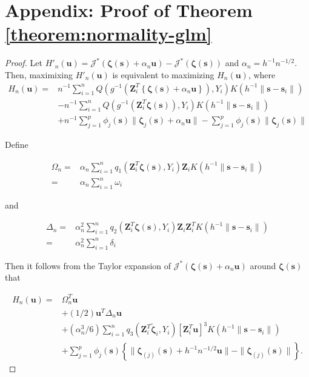 \documentclass[authoryear,review, 12pt]{elsarticle}
\begin{document}
\section*{Appendix: Proof of Theorem \ref{theorem:normality-glm}}
\begin{proof}
Let $H'_{n}(\bm{u})=\mathcal{J}^{*}\left(\bm{\zeta}\left(\bm{s}\right)+\alpha_{n}\bm{u}\right)-\mathcal{J}^{*}\left(\bm{\zeta}\left(\bm{s}\right)\right)$
and $\alpha_{n}=h^{-1}n^{-1/2}$. Then, maximixing $H'_{n}\left(\bm{u}\right)$
is equivalent to maximizing $H_{n}\left(\bm{u}\right)$, where 
\begin{align*}
H_{n}(\bm{u})= & n^{-1}\sum_{i=1}^{n}Q\left(g^{-1}\left(\bm{Z}_{i}^{T}\left\{ \bm{\zeta}\left(\bm{s}\right)+\alpha_{n}\bm{u}\right\} \right),Y_{i}\right)K\left(h^{-1}\|\bm{s}-\bm{s}_{i}\|\right)\\
 & -n^{-1}\sum_{i=1}^{n}Q\left(g^{-1}\left(\bm{Z}_{i}^{T}\bm{\zeta}\left(\bm{s}\right)\right),Y_{i}\right)K\left(h^{-1}\|\bm{s}-\bm{s}_{i}\|\right)\\
 & +n^{-1}\sum_{j=1}^{p}\phi_{j}\left(\bm{s}\right)\|\bm{\zeta}_{j}\left(\bm{s}\right)+\alpha_{n}\bm{u}\|-\sum_{j=1}^{p}\phi_{j}\left(\bm{s}\right)\|\bm{\zeta}_{j}\left(\bm{s}\right)\|
\end{align*}


Define

\begin{align*}
\Omega_{n}= & \alpha_{n}\sum_{i=1}^{n}q_{1}\left(\bm{Z}_{i}^{T}\bm{\zeta}\left(\bm{s}\right),Y_{i}\right)\bm{Z}_{i}K\left(h^{-1}\|\bm{s}-\bm{s}_{i}\|\right)\\
= & \alpha_{n}\sum_{i=1}^{n}\omega_{i}
\end{align*}


and 

\begin{align*}
\Delta_{n}= & \alpha_{n}^{2}\sum_{i=1}^{n}q_{2}\left(\bm{Z}_{i}^{T}\bm{\zeta}\left(\bm{s}\right),Y_{i}\right)\bm{Z}_{i}\bm{Z}_{i}^{T}K\left(h^{-1}\|\bm{s}-\bm{s}_{i}\|\right)\\
= & \alpha_{n}^{2}\sum_{i=1}^{n}\delta_{i}
\end{align*}


Then it follows from the Taylor expansion of $\mathcal{J}^{*}\left(\bm{\zeta}\left(\bm{s}\right)+\alpha_{n}\bm{u}\right)$
around $\bm{\zeta}\left(\bm{s}\right)$ that

\begin{align}
H_{n}\left(\bm{u}\right)= & \Omega_{n}^{T}\bm{u}\nonumber \\
 & +(1/2)\bm{u}^{T}\Delta_{n}\bm{u}\nonumber \\
 & +\left(\alpha_{n}^{3}/6\right)\sum_{i=1}^{n}q_{3}\left(\bm{Z}_{i}^{T}\tilde{\bm{\zeta}}_{i},Y_{i}\right)\left[\bm{Z}_{i}^{T}\bm{u}\right]^{3}K\left(h^{-1}\|\bm{s}-\bm{s}_{i}\|\right)\nonumber \\
 & +\sum_{j=1}^{p}\phi_{j}\left(\bm{s}\right)\left\{ \|\bm{\zeta}_{\left(j\right)}\left(\bm{s}\right)+h^{-1}n^{-1/2}\bm{u}\|-\|\bm{\zeta}_{\left(j\right)}\left(\bm{s}\right)\|\right\} .\label{eq:taylor-expanded-glm-criterion}
\end{align}



\end{proof}
\end{document}
